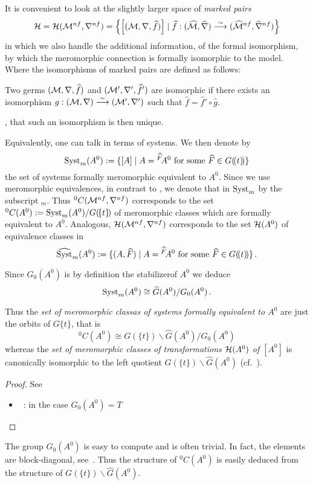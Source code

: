 It is convenient to look at the slightly larger space of \emph{marked pairs}
\[
  \mathcal{H}=\mathcal{H}(\mathcal{M}^{nf},\nabla^{nf})=\left\{
    \left[(\mathcal{M},\nabla,\widehat f)\right]
      \mid
      \widehat f:(\widehat{\mathcal{M}},\widehat\nabla)
        \overset{\sim}\longrightarrow
        (\widehat{\mathcal{M}}^{nf},\widehat\nabla^{nf})
  \right\}
\]
in which we also handle the additional information, of the formal isomorphism,
by which the meromorphic connection is formally isomorphic to the model.
Where the isomorphisms of marked pairs are defined as follows:
\begin{defn}
  Two germs $(\mathcal{M},\nabla,\widehat f)$ and $(\mathcal{M}',\nabla',\widehat f')$ are
  isomorphic if there exists an isomorphism
  $g:(\mathcal{M},\nabla)\overset{\sim}\longrightarrow(\mathcal{M}',\nabla')$ such that
  $\hat f=\hat f'\circ \hat g$.
  \begin{s-rem}
     \cite[111]{sabbah2007isomonodromic}, that such
    an isomorphism is then unique.
  \end{s-rem}
\end{defn}

Equivalently, one can talk in terms of systems. We then denote by
\[
  \operatorname{Syst}_m(A^0):=\{[A]
    \mid A={}^{\widehat F}\!A^0 \text{ for some } \widehat F\in G(\!(t)\!)\}
\]
the set of systems formally meromorphic equivalent to $A^0$.
Since we use meromorphic equivalences, in contrast to \cite{boalch,thboalch},
we denote that in $\operatorname{Syst}_m$ by the subscript ${}_m$.
Thus ${}^0C(\mathcal{M}^{nf},\nabla^{nf})$ corresponds to
the set ${}^0C(A^0):=\operatorname{Syst}_m(A^0)/G(\!\{t\}\!)$ of meromorphic classes which
are formally equivalent to $A^0$.
Analogous, $\mathcal{H}(\mathcal{M}^{nf},\nabla^{nf})$ corresponds to the set $\mathcal{H}(A^0)$ of
equivalence classes in
\[
  \widehat{\operatorname{Syst}}_m(A^0):=\{(A,\widehat F)
    \mid A={}^{\widehat F}\!A^0 \text{ for some } \widehat F\in G(\!(t)\!)\} \,.
\]

\begin{lem}
  Since $G_0(A^0)$ is by definition the stabilizer\TODO[correct?] of $A^0$ we
  deduce
  \[
    \operatorname{Syst}_m(A^0)\cong \widehat G(A^0)/G_0(A^0) \,.
  \]
  \begin{s-cor}
    Thus the \emph{set of meromorphic classas of systems formally equivalent
      to $A^0$} are just the orbits of $G\{t\}$, that is
    \[
      {}^0C(A^0)\cong G(\!\{t\}\!)\backslash\hat G(A^0)/G_0(A^0)
    \]
    whereas the \emph{set of meromorphic classes of transformations $\mathcal{H}(A^0)$
    of $[A^0]$} is canonically isomorphic to the left quotient
    $G(\!\{t\}\!)\backslash\hat G(A^0)$ (cf.\ \cite[Lem.1.17]{thboalch}).
  \end{s-cor}
\end{lem}
\begin{proof}
  See
  \begin{itemize}
    \item~\cite[6]{thboalch}: in the case $G_0(A^0)=T$
  \end{itemize}
\end{proof}

The group $G_0(A^0)$ is easy to compute and is often trivial. In fact, the
elements are block-diagonal, see~\cite[77]{Loday2014}.
Thus the structure of ${}^0C(A^0)$ is easily deduced from the structure of
$G(\!\{t\}\!)\backslash\hat G(A^0)$.
